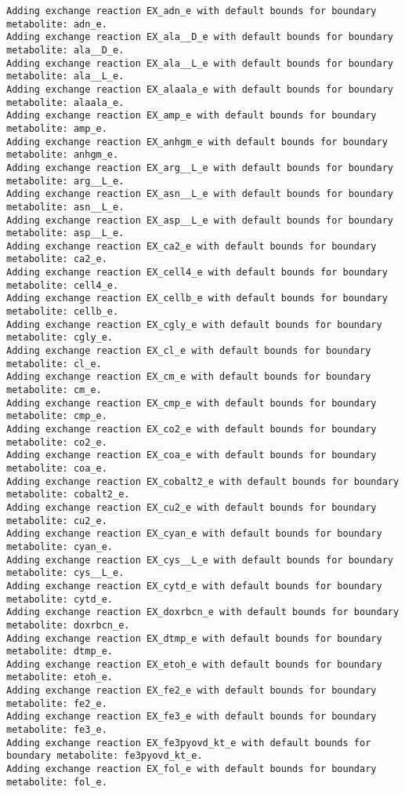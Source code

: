 \documentclass[
  letterpaper,
  DIV=11,
  numbers=noendperiod]{scrartcl}
\begin{document}
\begin{verbatim}
Adding exchange reaction EX_adn_e with default bounds for boundary metabolite: adn_e.
Adding exchange reaction EX_ala__D_e with default bounds for boundary metabolite: ala__D_e.
Adding exchange reaction EX_ala__L_e with default bounds for boundary metabolite: ala__L_e.
Adding exchange reaction EX_alaala_e with default bounds for boundary metabolite: alaala_e.
Adding exchange reaction EX_amp_e with default bounds for boundary metabolite: amp_e.
Adding exchange reaction EX_anhgm_e with default bounds for boundary metabolite: anhgm_e.
Adding exchange reaction EX_arg__L_e with default bounds for boundary metabolite: arg__L_e.
Adding exchange reaction EX_asn__L_e with default bounds for boundary metabolite: asn__L_e.
Adding exchange reaction EX_asp__L_e with default bounds for boundary metabolite: asp__L_e.
Adding exchange reaction EX_ca2_e with default bounds for boundary metabolite: ca2_e.
Adding exchange reaction EX_cell4_e with default bounds for boundary metabolite: cell4_e.
Adding exchange reaction EX_cellb_e with default bounds for boundary metabolite: cellb_e.
Adding exchange reaction EX_cgly_e with default bounds for boundary metabolite: cgly_e.
Adding exchange reaction EX_cl_e with default bounds for boundary metabolite: cl_e.
Adding exchange reaction EX_cm_e with default bounds for boundary metabolite: cm_e.
Adding exchange reaction EX_cmp_e with default bounds for boundary metabolite: cmp_e.
Adding exchange reaction EX_co2_e with default bounds for boundary metabolite: co2_e.
Adding exchange reaction EX_coa_e with default bounds for boundary metabolite: coa_e.
Adding exchange reaction EX_cobalt2_e with default bounds for boundary metabolite: cobalt2_e.
Adding exchange reaction EX_cu2_e with default bounds for boundary metabolite: cu2_e.
Adding exchange reaction EX_cyan_e with default bounds for boundary metabolite: cyan_e.
Adding exchange reaction EX_cys__L_e with default bounds for boundary metabolite: cys__L_e.
Adding exchange reaction EX_cytd_e with default bounds for boundary metabolite: cytd_e.
Adding exchange reaction EX_doxrbcn_e with default bounds for boundary metabolite: doxrbcn_e.
Adding exchange reaction EX_dtmp_e with default bounds for boundary metabolite: dtmp_e.
Adding exchange reaction EX_etoh_e with default bounds for boundary metabolite: etoh_e.
Adding exchange reaction EX_fe2_e with default bounds for boundary metabolite: fe2_e.
Adding exchange reaction EX_fe3_e with default bounds for boundary metabolite: fe3_e.
Adding exchange reaction EX_fe3pyovd_kt_e with default bounds for boundary metabolite: fe3pyovd_kt_e.
Adding exchange reaction EX_fol_e with default bounds for boundary metabolite: fol_e.

\end{verbatim}
\end{document}
